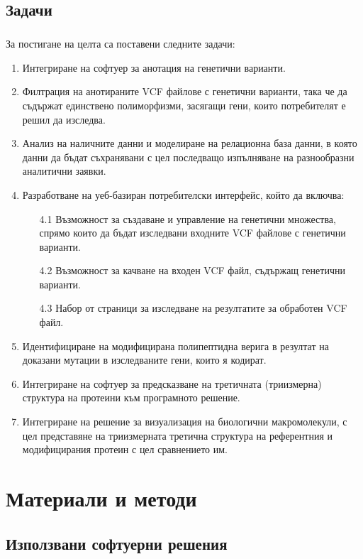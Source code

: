 \documentclass[pdftex,cyrillic,14pt,a4page,twoside,openright]{extreport}
\begin{document}
\section{Задачи}
\paragraph{}
За постигане на целта са поставени следните задачи:
\begin{enumerate}
	\item Интегриране на софтуер за анотация на генетични варианти.
	\item Филтрация на анотираните VCF файлове с генетични варианти, така че да съдържат единствено полиморфизми, засягащи гени, които потребителят е решил да изследва.
	\item Анализ на наличните данни и моделиране на релационна база данни, в която данни да бъдат съхранявани с цел последващо изпълняване на разнообразни аналитични заявки.
	\item Разработване на уеб-базиран потребителски интерфейс, който да включва:
		\begin{enumerate}
			\item[4.1] Възможност за създаване и управление на генетични множества, спрямо които да бъдат изследвани входните VCF файлове с генетични варианти.
			\item[4.2] Възможност за качване на входен VCF файл, съдържащ генетични варианти.
			\item[4.3] Набор от страници за изследване на резултатите за обработен VCF файл.
		\end{enumerate}
	\item Идентифициране на модифицирана полипептидна верига в резултат на доказани мутации в изследваните гени, които я кодират.
	\item Интегриране на софтуер за предсказване на третичната (триизмерна) структура на протеини към програмното решение.
	\item Интегриране на решение за визуализация на биологични макромолекули, с цел представяне на триизмерната третична структура на референтния и модифицирания протеин с цел сравнението им.
\end{enumerate}

\chapter{Материали и методи}

\section{Използвани софтуерни решения}
\end{document}

